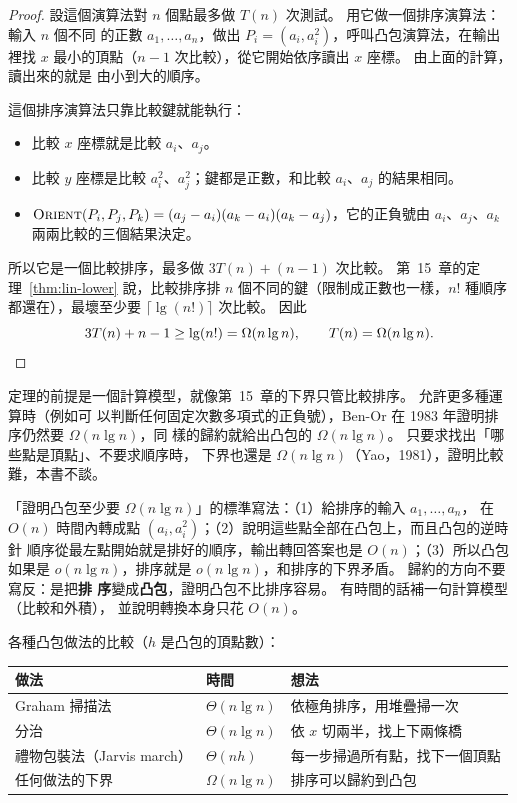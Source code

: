 \begin{proof}
設這個演算法對 $n$ 個點最多做 $T(n)$ 次測試。 用它做一個排序演算法：輸入 $n$ 個不同
的正數 $a_1, \ldots, a_n$，做出 $P_i = (a_i, a_i^2)$，呼叫凸包演算法，在輸出裡找 $x$
最小的頂點（$n - 1$ 次比較），從它開始依序讀出 $x$ 座標。 由上面的計算，讀出來的就是
由小到大的順序。

這個排序演算法只靠比較鍵就能執行：
\begin{itemize}
\item 比較 $x$ 座標就是比較 $a_i$、$a_j$。
\item 比較 $y$ 座標是比較 $a_i^2$、$a_j^2$；鍵都是正數，和比較 $a_i$、$a_j$ 的結果相同。
\item $\proc{Orient}(P_i, P_j, P_k) = (a_j - a_i)(a_k - a_i)(a_k - a_j)$，它的正負號由
$a_i$、$a_j$、$a_k$ 兩兩比較的三個結果決定。
\end{itemize}
所以它是一個比較排序，最多做 $3T(n) + (n - 1)$ 次比較。 第~15~章的定理~\ref{thm:lin-lower}
說，比較排序排 $n$ 個不同的鍵（限制成正數也一樣，$n!$ 種順序都還在），最壞至少要
$\lceil \lg(n!) \rceil$ 次比較。 因此
\[
3T(n) + n - 1 \ge \lg(n!) = \Omega(n \lg n), \qquad T(n) = \Omega(n \lg n). \qedhere
\]
\end{proof}

定理的前提是一個計算模型，就像第~15~章的下界只管比較排序。 允許更多種運算時（例如可
以判斷任何固定次數多項式的正負號），Ben-Or 在 1983 年證明排序仍然要 $\Omega(n \lg n)$，同
樣的歸約就給出凸包的 $\Omega(n \lg n)$。 只要求找出「哪些點是頂點」、不要求順序時，
下界也還是 $\Omega(n \lg n)$（Yao，1981），證明比較難，本書不談。

\begin{examnote}
「證明凸包至少要 $\Omega(n \lg n)$」的標準寫法：（1）給排序的輸入 $a_1, \ldots, a_n$，
在 $O(n)$ 時間內轉成點 $(a_i, a_i^2)$；（2）說明這些點全部在凸包上，而且凸包的逆時針
順序從最左點開始就是排好的順序，輸出轉回答案也是 $O(n)$；（3）所以凸包如果是
$o(n \lg n)$，排序就是 $o(n \lg n)$，和排序的下界矛盾。 歸約的方向不要寫反：是把\textbf{排
序}變成\textbf{凸包}，證明凸包不比排序容易。 有時間的話補一句計算模型（比較和外積），
並說明轉換本身只花 $O(n)$。
\end{examnote}

各種凸包做法的比較（$h$ 是凸包的頂點數）：

\begin{center}
\begin{tabular}{lll}
\toprule
做法 & 時間 & 想法 \\
\midrule
Graham 掃描法 & $\Theta(n \lg n)$ & 依極角排序，用堆疊掃一次 \\
分治 & $\Theta(n \lg n)$ & 依 $x$ 切兩半，找上下兩條橋 \\
禮物包裝法（Jarvis march） & $\Theta(nh)$ & 每一步掃過所有點，找下一個頂點 \\
任何做法的下界 & $\Omega(n \lg n)$ & 排序可以歸約到凸包 \\
\bottomrule
\end{tabular}
\end{center}


